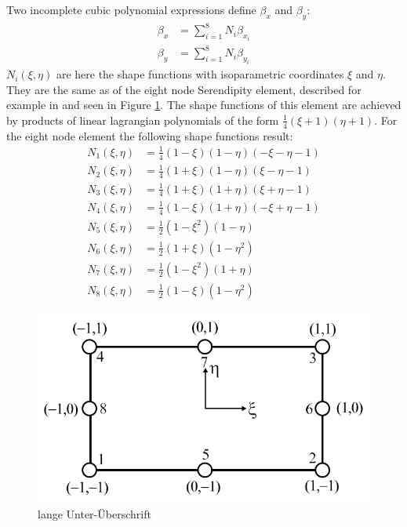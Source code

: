   Two incomplete cubic polynomial expressions define $\beta_x$ and $\beta_y$:
  \begin{align}
  \beta_x &= \sum_{i=1}^{8} N_i \beta_{x_i}\\
  \beta_y &= \sum_{i=1}^{8} N_i \beta_{y_i}
  \end{align}
  $N_i(\xi,\eta)$ are here the shape functions with isoparametric coordinates $\xi$ and $\eta$. They are the same as of the eight node Serendipity element, described for example in \cite{zienkiewicz2000finite} and seen in Figure \ref{fig:serendipity}. The shape functions of this element are achieved by products of linear lagrangian polynomials of the form $\frac{1}{4}(\xi+1)(\eta+1)$. For the eight node element the following shape functions result:
  \begin{align}
  N_1(\xi, \eta) &= \frac{1}{4}(1-\xi)(1-\eta)(-\xi-\eta-1) \nonumber\\
  N_2(\xi, \eta) &= \frac{1}{4}(1+\xi)(1-\eta)(\xi-\eta-1) \nonumber\\
  N_3(\xi, \eta) &= \frac{1}{4}(1+\xi)(1+\eta)(\xi+\eta-1) \nonumber\\
  N_4(\xi, \eta) &= \frac{1}{4}(1-\xi)(1+\eta)(-\xi+\eta-1) \nonumber\\
  N_5(\xi, \eta) &= \frac{1}{2}(1-\xi^2)(1-\eta) \nonumber\\
  N_6(\xi, \eta) &= \frac{1}{2}(1+\xi)(1-\eta^2) \nonumber\\
  N_7(\xi, \eta) &= \frac{1}{2}(1-\xi^2)(1+\eta) \nonumber\\
  N_8(\xi, \eta) &= \frac{1}{2}(1-\xi)(1-\eta^2) \nonumber
  \end{align}
  \begin{figure} %
  	\centering
  	\includegraphics[width=0.97\linewidth]{figures/serendipity}
  	\caption[kurze Unter-Überschrift]{lange Unter-Überschrift}
  	\label{fig:serendipity}
  \end{figure}
